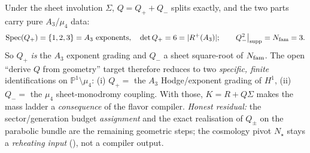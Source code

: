 \begin{keybox}
Under the sheet involution $\Sigma$, $Q=Q_+ + Q_-$ splits exactly, and the two
parts carry pure $A_3$/$\mu_4$ data:
\begin{equation}
  \operatorname{Spec}(Q_+)=\{1,2,3\}=\text{$A_3$ exponents},\quad \det Q_+=6=|R^+(A_3)|;
  \qquad Q_-^2\big|_{\mathrm{supp}}=N_{\mathrm{fam}}=3 .
\end{equation}
So $Q_+$ \emph{is} the $A_3$ exponent grading and $Q_-$ a sheet square-root of
$N_{\mathrm{fam}}$. The open ``derive $Q$ from geometry'' target therefore reduces to two
\emph{specific, finite} identifications on $\mathbb P^1\setminus\mu_4$:
(i) $Q_+ =$ the $A_3$ Hodge/exponent grading of $H^1$, (ii) $Q_- =$ the $\mu_4$
sheet-monodromy coupling. With those, $K=R+Q\Sigma$ makes the mass ladder a
\emph{consequence} of the flavor compiler. \emph{Honest residual:} the
sector/generation budget \emph{assignment} and the exact realisation of
$Q_\pm$ on the parabolic bundle are the remaining geometric steps; the cosmology
pivot $N_\star$ stays a \emph{reheating input} (\mC), not a compiler output.
\end{keybox}

